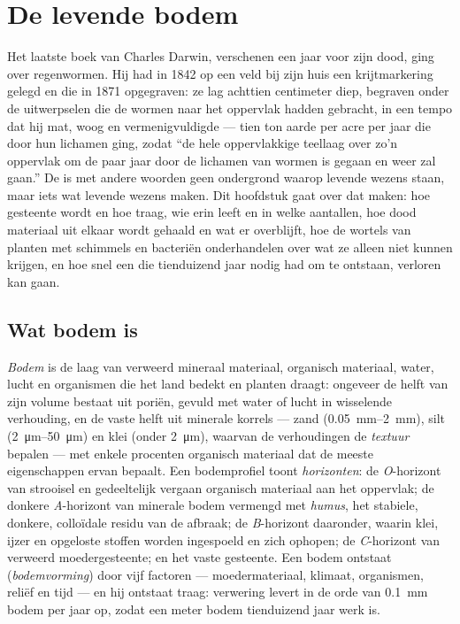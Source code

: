 \chapter{De levende bodem}\label{ch:b2:living-soil}

Het laatste boek van Charles Darwin, verschenen een jaar voor zijn dood, ging
over regenwormen. Hij had in 1842 op een veld bij zijn huis een krijtmarkering
gelegd en die in 1871 opgegraven: ze lag achttien centimeter diep, begraven
onder de uitwerpselen die de wormen naar het oppervlak hadden gebracht, in een
tempo dat hij mat, woog en vermenigvuldigde --- tien ton aarde per acre per
jaar die door hun lichamen ging, zodat ``de hele oppervlakkige teellaag over
zo'n oppervlak om de paar jaar door de lichamen van wormen is gegaan en weer
zal gaan.'' De  is met andere woorden geen ondergrond waarop levende wezens
staan, maar iets wat levende wezens maken. Dit hoofdstuk gaat over dat maken:
hoe gesteente  wordt en hoe traag, wie erin leeft en in welke aantallen,
hoe dood materiaal uit elkaar wordt gehaald en wat er overblijft, hoe de wortels
van planten met schimmels en bacteriën onderhandelen over wat ze alleen niet
kunnen krijgen, en hoe snel een  die tienduizend jaar nodig had om te
ontstaan, verloren kan gaan.

\section{Wat bodem is}

\begin{definition}\label{def:b2:living-soil:soil}
\emph{Bodem} is de laag van verweerd mineraal materiaal, organisch
materiaal, water, lucht en organismen die het land bedekt en planten draagt:
ongeveer de helft van zijn volume bestaat uit poriën, gevuld met water of lucht
in wisselende verhouding, en de vaste helft uit minerale korrels ---
zand (\qtyrange{0.05}{2}{mm}), silt (\qtyrange{2}{50}{\micro m}) en
klei (onder \qty{2}{\micro m}), waarvan de verhoudingen de
\emph{textuur} bepalen --- met enkele procenten organisch materiaal dat de
meeste eigenschappen ervan bepaalt. Een bodemprofiel toont
\emph{horizonten}: de \emph{O}-horizont van strooisel en gedeeltelijk vergaan
organisch materiaal aan het oppervlak; de donkere \emph{A}-horizont van minerale
bodem vermengd met \emph{humus}, het stabiele, donkere, colloïdale residu van
de afbraak; de \emph{B}-horizont daaronder, waarin klei, ijzer en opgeloste
stoffen worden ingespoeld en zich ophopen; de \emph{C}-horizont van verweerd
moedergesteente; en het vaste gesteente. Een bodem ontstaat
(\emph{bodemvorming}) door vijf factoren --- moedermateriaal, klimaat,
organismen, reliëf en tijd --- en hij ontstaat traag: verwering levert in de
orde van \qty{0.1}{mm} bodem per jaar op, zodat een meter bodem tienduizend
jaar werk is.
\end{definition}

